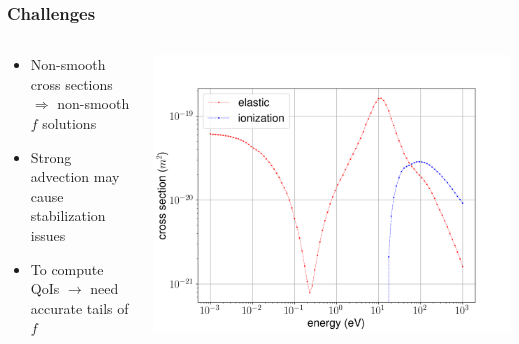 \documentclass[mathserif, aspectratio=169]{beamer}
\begin{document}
\begin{frame}
	\frametitle{Challenges}
	\begin{columns}
		\begin{column}{0.3\textwidth}
			\begin{itemize}
				\item Non-smooth cross sections $\Rightarrow$ non-smooth $f$ solutions
				\item Strong advection may cause stabilization issues
				\item To compute QoIs $\rightarrow$ need accurate tails of $f$ 
			\end{itemize}
		\end{column}
		\begin{column}{0.7\textwidth}
			\vspace*{-0.8in}
			\begin{center}
				\includegraphics[width=\columnwidth]{g0_g2_cs.png}
			\end{center}
		\end{column}
	\end{columns}
\end{frame}
\end{document}
